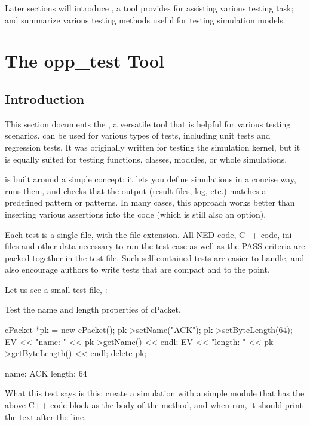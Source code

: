 Later sections will introduce , a tool {\opp} provides
for assisting various testing task; and summarize various testing methods
useful for testing simulation models.


\section{The opp\_test Tool}
\label{sec:testing:opptest}

\subsection{Introduction}
\label{sec:testing:opptest:introduction}

This section documents the , a versatile tool that is
helpful for various testing scenarios.  can be used for
various types of tests, including unit tests and regression tests. It was
originally written for testing the {\opp} simulation kernel, but it is
equally suited for testing functions, classes, modules, or whole
simulations.

 is built around a simple concept: it lets you define
simulations in a concise way, runs them, and checks that the output (result
files, log, etc.) matches a predefined pattern or patterns. In many cases,
this approach works better than inserting various assertions into the code
(which is still also an option).

Each test is a single file, with the  file extension. All NED
code, C++ code, ini files and other data necessary to run the test case as
well as the PASS criteria are packed together in the test file. Such
self-contained tests are easier to handle, and also encourage authors to
write tests that are compact and to the point.

Let us see a small test file, :

\begin{filelisting}
Test the name and length properties of cPacket.

cPacket *pk = new cPacket();
pk->setName("ACK");
pk->setByteLength(64);
EV << "name: " << pk->getName() << endl;
EV << "length: " << pk->getByteLength() << endl;
delete pk;

name: ACK
length: 64
\end{filelisting}

What this test says is this: create a simulation with a simple module
that has the above C++ code block as the body of the  method,
and when run, it should print the text after the  line.

